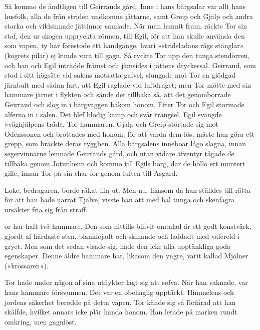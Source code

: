 Så kommo de ändtligen till Geirrauds gård. Inne i hans bärgsalar var
allt hans husfolk, alla de från striden undkomne jättarne, samt Greip
och Gjalp och andra starka och vildsinnade jättinnor samlade. När man
hunnit fram, räckte Tor sin staf, den ur skogen uppryckta rönnen, till
Egil, för att han skulle använda den som vapen, ty här förestode ett
handgänge, hvari »stridsladans rågs stänglar» (kogrets pilar) ej kunde
vara till gagn. Så ryckte Tor upp den tunga stendörren, och han och Egil
inträdde främst och jämsides i jättens dryckessal. Geirraud, som stod i
sitt högsäte vid salens motsatta gafvel, slungade mot Tor en glödgad
järnbult med sådan fart, att Egil raglade vid luftdraget; men Tor mötte
med sin hammare järnet i flykten och sände det tillbaka så, att det
genomborrade Geirraud och slog in i bärgväggen bakom honom. Efter Tor
och Egil stormade alferna in i salen. Det blef blodig kamp och svår
trängsel. Egil svängde »väghjälpens träd», Tor hammaren. Gjalp och Greip
störtade sig mot Odenssonen och brottades med honom; för att varda dem
lös, måste han göra ett grepp, som bräckte deras ryggben. Alla
bärgsalens inneboar lågo slagna, innan segervinnarne lemnade Geirrauds
gård, och utan vidare äfventyr tågade de tillbaka genom Jotunheim och
kommo till Egils borg, där de höllo ett muntert gille, innan Tor på sin
char for genom luften till Asgard.

Loke, bedragaren, borde råkat illa ut. Men nu, likasom då han ställdes
till rätta för att han hade narrat Tjalve, visste han att med hal tunga
och skenfagra ursäkter fria sig från straff.

\endSecII


\dropcapT or har haft två hammare. Den som hittills blifvit omtalad är ett godt
konstvärk, gjordt af hårdaste sten, blankfejadt och skinande och laddadt
med vafereld i gryet. Men som det sedan visade sig, hade den icke alla
upptänkliga goda egenskaper. Denne äldre hammare har, likasom den yngre,
varit kallad Mjölner (»krossaren»).

Tor hade under någon af sina utflykter lagt sig att sofva. När han
vaknade, var hans hammare försvunnen. Det var en obehaglig upptäckt.
Himmelens och jordens säkerhet berodde på detta vapen. Tor kände sig så
förfärad att han skälfde, hvilket annars icke plär hända honom. Han
letade på marken rundt omkring, men gagnlöst.

